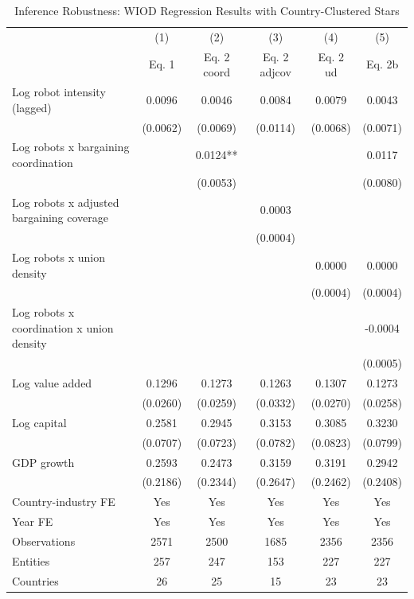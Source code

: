 \begin{table}[!htbp]
\centering
\begin{threeparttable}
\caption{Inference Robustness: WIOD Regression Results with Country-Clustered Stars}
\label{tab:wiod_regression_table_combined_clusterstars}
\small
\begin{tabular}{lccccc}
\toprule
 & (1) & (2) & (3) & (4) & (5) \\
 & Eq. 1 & Eq. 2 coord & Eq. 2 adjcov & Eq. 2 ud & Eq. 2b \\
\midrule
Log robot intensity (lagged) & 0.0096 & 0.0046 & 0.0084 & 0.0079 & 0.0043 \\
 & (0.0062) & (0.0069) & (0.0114) & (0.0068) & (0.0071) \\
\addlinespace[0.2em]
Log robots x bargaining coordination &  & 0.0124** &  &  & 0.0117 \\
 &  & (0.0053) &  &  & (0.0080) \\
\addlinespace[0.2em]
Log robots x adjusted bargaining coverage &  &  & 0.0003 &  &  \\
 &  &  & (0.0004) &  &  \\
\addlinespace[0.2em]
Log robots x union density &  &  &  & 0.0000 & 0.0000 \\
 &  &  &  & (0.0004) & (0.0004) \\
\addlinespace[0.2em]
Log robots x coordination x union density &  &  &  &  & -0.0004 \\
 &  &  &  &  & (0.0005) \\
\addlinespace[0.2em]
Log value added & 0.1296 & 0.1273 & 0.1263 & 0.1307 & 0.1273 \\
 & (0.0260) & (0.0259) & (0.0332) & (0.0270) & (0.0258) \\
\addlinespace[0.2em]
Log capital & 0.2581 & 0.2945 & 0.3153 & 0.3085 & 0.3230 \\
 & (0.0707) & (0.0723) & (0.0782) & (0.0823) & (0.0799) \\
\addlinespace[0.2em]
GDP growth & 0.2593 & 0.2473 & 0.3159 & 0.3191 & 0.2942 \\
 & (0.2186) & (0.2344) & (0.2647) & (0.2462) & (0.2408) \\
\midrule
Country-industry FE & Yes & Yes & Yes & Yes & Yes \\
Year FE & Yes & Yes & Yes & Yes & Yes \\
Observations & 2571 & 2500 & 1685 & 2356 & 2356 \\
Entities & 257 & 247 & 153 & 227 & 227 \\
Countries & 26 & 25 & 15 & 23 & 23 \\

\end{tabular}
\end{threeparttable}
\end{table}
